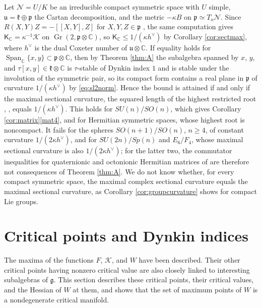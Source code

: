 \documentclass [leqno, 10pt]{amsart}
\theoremstyle{definition}
\numberwithin{equation}{section}
\newcommand{\grass}{\operatorname{Gr}}
\newcommand{\sect}{\mathscr{K}}
\newcommand{\spn}{\operatorname{Span}}
\newcommand{\g}{\mathfrak{g}}
\newcommand{\p}{\mathfrak{p}}
\newcommand{\com}{\mathbb C}
\newcommand{\hv}{h^\vee}
\begin{document}
Let $\mathcal{N} = U/K$ be an irreducible compact symmetric space with $U$ simple, $\mathfrak{u} = \mathfrak{k} \oplus \p$ the Cartan decomposition, and the metric $-\kappa B$ on $\p \simeq T_{o}\mathcal{N}$. Since $R(X, Y)Z = -[[X, Y], Z]$ for $X, Y, Z \in \p$ \cite{Helgason}, the same computation gives $\mathsf{K}_{\com} = \kappa^{-1}\sect$ on $\grass(2, \p \otimes \com)$, so $\mathsf{K}_{\com} \leq 1/(\kappa\hv)$ by Corollary \ref{cor:sectmax}, where $\hv$ is the dual Coxeter number of $\mathfrak{u} \otimes \com$. If equality holds for $\spn_{\com}\{x, y\} \subset \p \otimes \com$, then by Theorem \ref{thm:A} the subalgebra spanned by $x$, $y$, and $\tau[x, y] \in \mathfrak{k} \otimes \com$ is $\tau$-stable of Dynkin index $1$ and is stable under the involution of the symmetric pair, so its compact form contains a real plane in $\p$ of curvature $1/(\kappa\hv)$ by \eqref{eq:sl2norm}. Hence the bound is attained if and only if the maximal sectional curvature, the squared length of the highest restricted root \cite[p.~334, Theorem~11.1]{Helgason-dgls}, \cite[Table~5.1]{Liu-curvatureestimates}, equals $1/(\kappa\hv)$. This holds for $SU(n)/SO(n)$, which gives Corollary \ref{cor:matrix}\ref{mat4}, and for Hermitian symmetric spaces, whose highest root is noncompact. It fails for the spheres $SO(n+1)/SO(n)$, $n \geq 4$, of constant curvature $1/(2\kappa\hv)$, and for $SU(2n)/Sp(n)$ and $E_{6}/F_{4}$, whose maximal sectional curvature is also $1/(2\kappa\hv)$; for the latter two, the commutator inequalities for quaternionic and octonionic Hermitian matrices of \cite[Theorem~6.3]{Fox-sectna} are therefore not consequences of Theorem \ref{thm:A}. We do not know whether, for every compact symmetric space, the maximal complex sectional curvature equals the maximal sectional curvature, as Corollary \ref{cor:groupcurvature} shows for compact Lie groups.

\section{Critical points and Dynkin indices}\label{sec:critical}
The maxima of the functions $F$, $\sect$, and $W$ have been described. Their other critical points having nonzero critical value are also closely linked to interesting subalgebras of $\g$. 
This section describes these critical points, their critical values, and the Hessian of $W$ at them, and shows that the set of maximum points of $W$ is a nondegenerate critical manifold.
\end{document}
